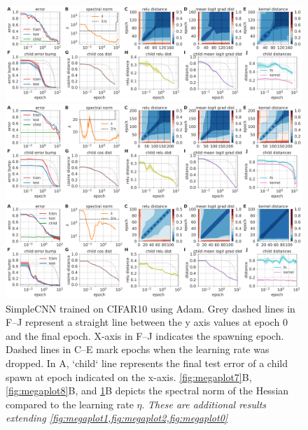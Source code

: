 \documentclass{article}
\begin{document}
\begin{figure}[t!]
    \centering
    \includegraphics[width=\linewidth]{figures/cifar10-resnet20-bn-mom.pdf}
    \caption{ResNet20 with batchnorm trained on CIFAR10 using momentum.
    }
    \label{fig:megaplot7}
    \centering
    \includegraphics[width=\linewidth]{figures/cifar100-resnet20-bn-mom.pdf}
    \caption{ResNet20 with batchnorm trained on CIFAR100 using momentum.
    }
    \label{fig:megaplot8}
    \centering
    \includegraphics[width=\linewidth]{figures/simplecnn-cifar10.pdf}
    \caption{SimpleCNN trained on CIFAR10 using Adam. \newline
    Grey dashed lines in F--J represent a straight line between the y axis values at epoch 0 and the final epoch. X-axis in F--J indicates the spawning epoch.
    Dashed lines in C--E mark epochs when the learning rate was dropped.
    In A, `child` line represents the final test error of a child spawn at epoch indicated on the x-axis. \cref{fig:megaplot7}B, \cref{fig:megaplot8}B, and \cref{fig:megaplot3}B depicts the spectral norm of the Hessian compared to the learning rate $\eta$. \emph{These are additional results extending \cref{fig:megaplot1,fig:megaplot2,fig:megaplot0}}
    }
    \label{fig:megaplot3}
\end{figure}
\end{document}
